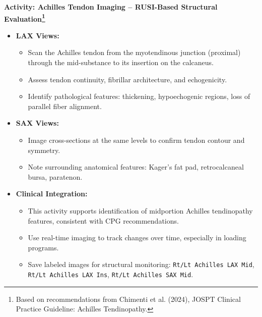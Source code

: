 \begin{labactivitybox}
\textbf{Activity: Achilles Tendon Imaging – RUSI-Based Structural Evaluation\footnote{Based on recommendations from Chimenti et al. (2024), JOSPT Clinical Practice Guideline: Achilles Tendinopathy.}}

\begin{itemize}
  \item \textbf{LAX Views:}
  \begin{itemize}
    \item Scan the Achilles tendon from the myotendinous junction (proximal) through the mid-substance to its insertion on the calcaneus.
    \item Assess tendon continuity, fibrillar architecture, and echogenicity.
    \item Identify pathological features: thickening, hypoechogenic regions, loss of parallel fiber alignment.
  \end{itemize}

  \item \textbf{SAX Views:}
  \begin{itemize}
    \item Image cross-sections at the same levels to confirm tendon contour and symmetry.
    \item Note surrounding anatomical features: Kager’s fat pad, retrocalcaneal bursa, paratenon.
  \end{itemize}

  \item \textbf{Clinical Integration:}
  \begin{itemize}
    \item This activity supports identification of midportion Achilles tendinopathy features, consistent with CPG recommendations.
    \item Use real-time imaging to track changes over time, especially in loading programs.
    \item Save labeled images for structural monitoring: \texttt{Rt/Lt Achilles LAX Mid}, \texttt{Rt/Lt Achilles LAX Ins}, \texttt{Rt/Lt Achilles SAX Mid}.
  \end{itemize}
\end{itemize}
\end{labactivitybox}

